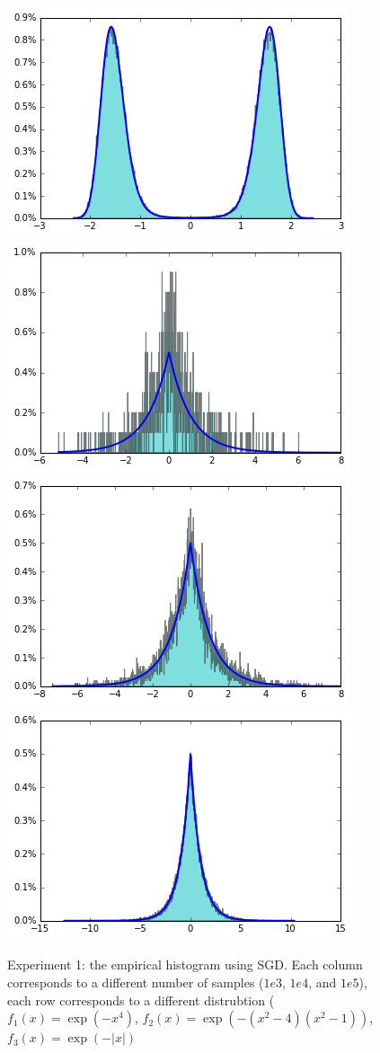 \documentclass[preprint,12pt,3p]{elsarticle}
\begin{document}
\begin{figure}
    \includegraphics[width=.3\textwidth]{../figure/case2_step_0.005_iter_1e5.png}
    \includegraphics[width=.3\textwidth]{../figure/case3_step_0.005_iter_1e3.png}
    \includegraphics[width=.3\textwidth]{../figure/case3_step_0.005_iter_1e4.png}
    \includegraphics[width=.3\textwidth]{../figure/case3_step_0.005_iter_1e5.png}
    \caption{Experiment 1: the empirical histogram using SGD. Each column corresponds to a different number of samples ($1e3$, $1e4$, and $1e5$), each row corresponds to a different distrubtion ($f_1(x) = \exp(-x^4)$, $f_2(x) = \exp(-(x^2 - 4)(x^2 - 1))$, $f_3(x) = \exp(-|x|)$}
    \label{Fig:exp1}
\end{figure}
\end{document}
